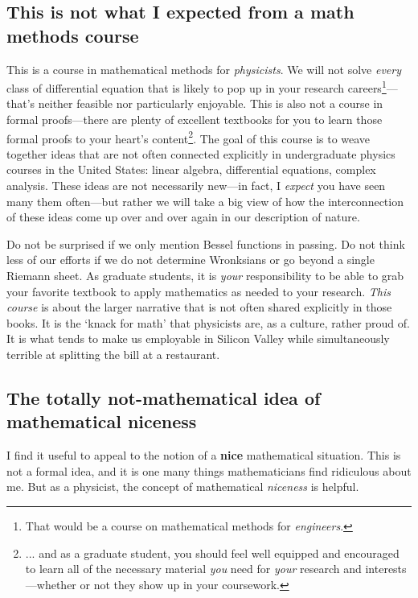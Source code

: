 \subsection{This is not what I expected from a math methods course}

This is a course in mathematical methods for \emph{physicists}. We will not solve \emph{every} class of differential equation that is likely to pop up in your research careers\footnote{That would be a course on mathematical methods for \emph{engineers}.}---that's neither feasible nor particularly enjoyable. 
%
This is also not a course in formal proofs---there are plenty of excellent textbooks for you to learn those formal proofs to your heart's content\footnote{... and as a graduate student, you should feel well equipped and encouraged to learn all of the necessary material \emph{you} need for \emph{your} research and interests---whether or not they show up in your coursework.}. 
%
The goal of this course is to weave together ideas that are not often connected explicitly in undergraduate physics courses in the United States: linear algebra, differential equations, complex analysis. These ideas are not necessarily new---in fact, I \emph{expect} you have seen many them often---but rather we will take a big view of how the interconnection of these ideas come up over and over again in our description of nature.

Do not be surprised if we only mention Bessel functions in passing. Do not think less of our efforts if we do not determine Wronksians or go beyond a single Riemann sheet. As graduate students, it is \emph{your} responsibility to be able to grab your favorite textbook to apply mathematics as needed to your research. \emph{This course} is about the larger narrative that is not often shared explicitly in those books. It is the `knack for math' that physicists are, as a culture, rather proud of. It is what tends to make us employable in Silicon Valley while simultaneously terrible at splitting the bill at a restaurant. 
 



\subsection{The totally not-mathematical idea  of mathematical niceness}
\label{sec:niceness}

I find it useful to appeal to the notion of a \textbf{nice} mathematical situation. This is not a formal idea, and it is one many things mathematicians find ridiculous about me. But as a physicist, the concept of mathematical \emph{niceness} is helpful. 

